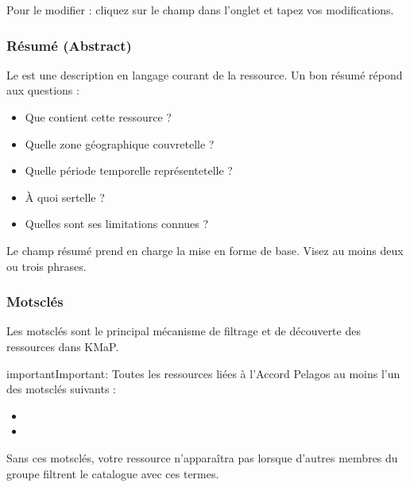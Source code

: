 \documentclass[letterpaper,10pt,english]{sphinxmanual}
\begin{document}
\sphinxAtStartPar
Pour le modifier : cliquez sur le champ  dans l’onglet  et tapez
vos modifications.


\subsubsection{Résumé (Abstract)}
\label{\detokenize{fr/03_gerer_metadonnees:resume-abstract}}
\sphinxAtStartPar
Le  est une description en langage courant de la ressource. Un bon résumé
répond aux questions :
\begin{itemize}
\item {} 
\sphinxAtStartPar
Que contient cette ressource ?

\item {} 
\sphinxAtStartPar
Quelle zone géographique couvre\sphinxhyphen{}t\sphinxhyphen{}elle ?

\item {} 
\sphinxAtStartPar
Quelle période temporelle représente\sphinxhyphen{}t\sphinxhyphen{}elle ?

\item {} 
\sphinxAtStartPar
À quoi sert\sphinxhyphen{}elle ?

\item {} 
\sphinxAtStartPar
Quelles sont ses limitations connues ?

\end{itemize}

\sphinxAtStartPar
Le champ résumé prend en charge la mise en forme de base. Visez au moins deux ou trois
phrases.


\subsubsection{Mots\sphinxhyphen{}clés}
\label{\detokenize{fr/03_gerer_metadonnees:mots-cles}}
\sphinxAtStartPar
Les mots\sphinxhyphen{}clés sont le principal mécanisme de filtrage et de découverte des ressources
dans KMaP.

\begin{sphinxadmonition}{important}{Important:}
\sphinxAtStartPar
Toutes les ressources liées à l’Accord Pelagos  au moins l’un
des mots\sphinxhyphen{}clés suivants :
\begin{itemize}
\item {} 
\sphinxAtStartPar
{}

\item {} 
\sphinxAtStartPar
{}

\end{itemize}

\sphinxAtStartPar
Sans ces mots\sphinxhyphen{}clés, votre ressource n’apparaîtra pas lorsque d’autres membres du
groupe filtrent le catalogue avec ces termes.
\end{sphinxadmonition}
\end{document}
